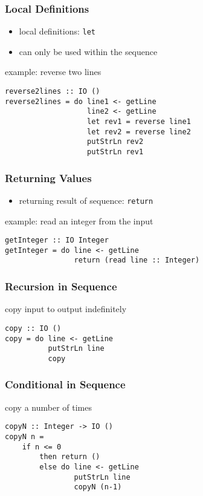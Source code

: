 \documentclass[dvipsnames]{beamer}
\theoremstyle{plain}
\begin{document}
\begin{frame}[fragile]
  \frametitle{Local Definitions}

  \begin{itemize}
    \item local definitions: \lstinline{let}
    \item can only be used within the sequence
  \end{itemize}

  \begin{exampleblock}{example: reverse two lines}
    \begin{lstlisting}
reverse2lines :: IO ()
reverse2lines = do line1 <- getLine
                   line2 <- getLine
                   let rev1 = reverse line1
                   let rev2 = reverse line2
                   putStrLn rev2
                   putStrLn rev1
    \end{lstlisting}
  \end{exampleblock}
\end{frame}

\begin{frame}[fragile]
  \frametitle{Returning Values}

  \begin{itemize}
    \item returning result of sequence: \lstinline{return}
  \end{itemize}

  \begin{exampleblock}{example: read an integer from the input}
    \begin{lstlisting}
getInteger :: IO Integer
getInteger = do line <- getLine
                return (read line :: Integer)
    \end{lstlisting}
  \end{exampleblock}
\end{frame}

\begin{frame}[fragile]
  \frametitle{Recursion in Sequence}

  \begin{exampleblock}{copy input to output indefinitely}
    \begin{lstlisting}
copy :: IO ()
copy = do line <- getLine
          putStrLn line
          copy
    \end{lstlisting}
  \end{exampleblock}
\end{frame}

\begin{frame}[fragile]
  \frametitle{Conditional in Sequence}

  \begin{exampleblock}{copy a number of times}
    \begin{lstlisting}
copyN :: Integer -> IO ()
copyN n =
    if n <= 0
        then return ()
        else do line <- getLine
                putStrLn line
                copyN (n-1)
    \end{lstlisting}
  \end{exampleblock}
\end{frame}
\end{document}
